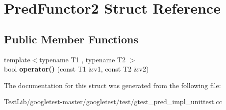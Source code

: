 \hypertarget{structPredFunctor2}{}\section{Pred\+Functor2 Struct Reference}
\label{structPredFunctor2}
\subsection*{Public Member Functions}
\begin{DoxyCompactItemize}
\item 
\mbox{\label{structPredFunctor2_a2142c86e4c0a3139e167dd3f13eb7f6f}} 
{\footnotesize template$<$typename T1 , typename T2 $>$ }\\bool {\bfseries operator()} (const T1 \&v1, const T2 \&v2)
\end{DoxyCompactItemize}


The documentation for this struct was generated from the following file\+:\begin{DoxyCompactItemize}
\item 
Test\+Lib/googletest-\/master/googletest/test/gtest\+\_\+pred\+\_\+impl\+\_\+unittest.\+cc\end{DoxyCompactItemize}
